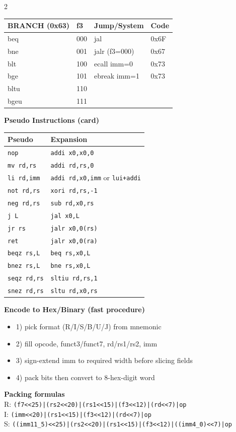 \documentclass[10pt]{article}
\newcommand{\hdr}[1]{\vspace{2pt}\textbf{#1}\vspace{1pt}\\}
\begin{document}
\begin{multicols}{2}
\begin{tabular}{@{}llll@{}}
\toprule
\textbf{BRANCH (0x63)} & \textbf{f3} & \textbf{Jump/System} & \textbf{Code} \\
\midrule
beq & 000 & jal & 0x6F \\
bne & 001 & jalr (f3=000) & 0x67 \\
blt & 100 & ecall imm=0 & 0x73 \\
bge & 101 & ebreak imm=1 & 0x73 \\
bltu & 110 & & \\
bgeu & 111 & & \\
\bottomrule
\end{tabular}
\footnotesize

\hdr{Pseudo Instructions (card)}
\scriptsize
\begin{tabular}{@{}ll@{}}
\toprule
Pseudo & Expansion \\
\midrule
\texttt{nop} & \texttt{addi x0,x0,0} \\
\texttt{mv rd,rs} & \texttt{addi rd,rs,0} \\
\texttt{li rd,imm} & \texttt{addi rd,x0,imm} or \texttt{lui+addi} \\
\texttt{not rd,rs} & \texttt{xori rd,rs,-1} \\
\texttt{neg rd,rs} & \texttt{sub rd,x0,rs} \\
\texttt{j L} & \texttt{jal x0,L} \\
\texttt{jr rs} & \texttt{jalr x0,0(rs)} \\
\texttt{ret} & \texttt{jalr x0,0(ra)} \\
\texttt{beqz rs,L} & \texttt{beq rs,x0,L} \\
\texttt{bnez rs,L} & \texttt{bne rs,x0,L} \\
\texttt{seqz rd,rs} & \texttt{sltiu rd,rs,1} \\
\texttt{snez rd,rs} & \texttt{sltu rd,x0,rs} \\
\bottomrule
\end{tabular}
\footnotesize

\hdr{Encode to Hex/Binary (fast procedure)}
\begin{itemize}
\item 1) pick format (R/I/S/B/U/J) from mnemonic
\item 2) fill opcode, funct3/funct7, rd/rs1/rs2, imm
\item 3) sign-extend imm to required width before slicing fields
\item 4) pack bits then convert to 8-hex-digit word
\end{itemize}
\scriptsize
\textbf{Packing formulas}\\
R: \texttt{(f7<<25)|(rs2<<20)|(rs1<<15)|(f3<<12)|(rd<<7)|op}\\
I: \texttt{(imm<<20)|(rs1<<15)|(f3<<12)|(rd<<7)|op}\\
S: \texttt{((imm11\_5)<<25)|(rs2<<20)|(rs1<<15)|(f3<<12)|((imm4\_0)<<7)|op}
\footnotesize


\end{multicols}
\end{document}
